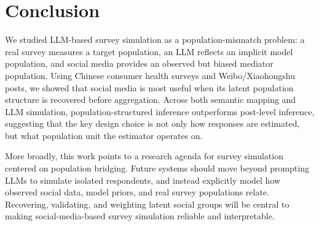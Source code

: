 \documentclass{article}
\begin{document}


\section{Conclusion}
\label{sec:conclusion}

We studied LLM-based survey simulation as a population-mismatch problem:
a real survey measures a target population,
an LLM reflects an implicit model population,
and social media provides an observed but biased mediator population.
Using Chinese consumer health surveys and Weibo/Xiaohongshu posts,
we showed that social media is most useful when its latent population structure is recovered before aggregation.
Across both semantic mapping and LLM simulation,
population-structured inference outperforms post-level inference,
suggesting that the key design choice is not only how responses are estimated,
but what population unit the estimator operates on.

More broadly, this work points to a research agenda for survey simulation centered on population bridging.
Future systems should move beyond prompting LLMs to simulate isolated respondents,
and instead explicitly model how observed social data, model priors, and real survey populations relate.
Recovering, validating, and weighting latent social groups will be central to making social-media-based survey simulation reliable and interpretable.
\end{document}
